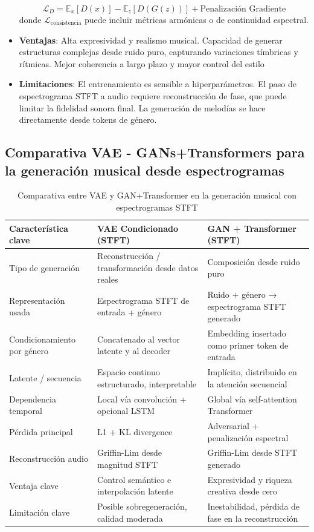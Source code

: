 \begin{itemize}
\[    \]
    \[
    \mathcal{L}_D = \mathbb{E}_{x}[D(x)] - \mathbb{E}_{z}[D(G(z))] + \text{Penalización Gradiente}
    \]
    donde $\mathcal{L}_{\text{consistencia}}$ puede incluir métricas armónicas o de continuidad espectral.
  \item \textbf{Ventajas}: Alta expresividad y realismo musical. Capacidad de generar estructuras complejas desde ruido puro, capturando variaciones tímbricas y rítmicas. Mejor coherencia a largo plazo y mayor control del estilo
  \item \textbf{Limitaciones}: El entrenamiento es sensible a hiperparámetros. El paso de espectrograma STFT a audio requiere reconstrucción de fase, que puede limitar la fidelidad sonora final. La generación de melodías se hace directamente desde tokens de género.
\end{itemize}

\subsection{Comparativa VAE - GANs+Transformers para la generación musical desde espectrogramas}
\begin{table}[H]
    \centering
    \caption{Comparativa entre VAE y GAN+Transformer en la generación musical con espectrogramas STFT}
    \begin{tabular}{|p{4.2cm}|p{5.5cm}|p{5.5cm}|}
    \hline
    \textbf{Característica clave} & \textbf{VAE Condicionado (STFT)} & \textbf{GAN + Transformer (STFT)} \\
    \hline
    Tipo de generación & Reconstrucción / transformación desde datos reales & Composición desde ruido puro \\
    \hline
    Representación usada & Espectrograma STFT de entrada + género & Ruido + género → espectrograma STFT generado \\
    \hline
    Condicionamiento por género & Concatenado al vector latente y al decoder & Embedding insertado como primer token de entrada \\
    \hline
    Latente / secuencia & Espacio continuo estructurado, interpretable & Implícito, distribuido en la atención secuencial \\
    \hline
    Dependencia temporal & Local vía convolución + opcional LSTM & Global vía self-attention Transformer \\
    \hline
    Pérdida principal & L1 + KL divergence & Adversarial + penalización espectral \\
    \hline
    Reconstrucción audio & Griffin-Lim desde magnitud STFT & Griffin-Lim desde STFT generado \\
    \hline
    Ventaja clave & Control semántico e interpolación latente & Expresividad y riqueza creativa desde cero \\
    \hline
    Limitación clave & Posible sobregeneración, calidad moderada & Inestabilidad, pérdida de fase en la reconstrucción \\
    \hline
    \end{tabular}
\end{table}    